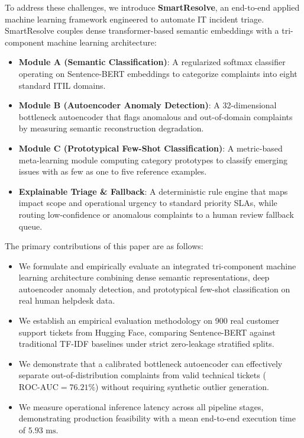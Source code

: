 \documentclass[conference]{IEEEtran}
\begin{document}
To address these challenges, we introduce \textbf{SmartResolve}, an end-to-end applied machine learning framework engineered to automate IT incident triage. SmartResolve couples dense transformer-based semantic embeddings with a tri-component machine learning architecture:
\begin{itemize}
    \item \textbf{Module A (Semantic Classification)}: A regularized softmax classifier operating on Sentence-BERT embeddings to categorize complaints into eight standard ITIL domains.
    \item \textbf{Module B (Autoencoder Anomaly Detection)}: A 32-dimensional bottleneck autoencoder that flags anomalous and out-of-domain complaints by measuring semantic reconstruction degradation.
    \item \textbf{Module C (Prototypical Few-Shot Classification)}: A metric-based meta-learning module computing category prototypes to classify emerging issues with as few as one to five reference examples.
    \item \textbf{Explainable Triage \& Fallback}: A deterministic rule engine that maps impact scope and operational urgency to standard priority SLAs, while routing low-confidence or anomalous complaints to a human review fallback queue.
\end{itemize}

The primary contributions of this paper are as follows:
\begin{itemize}
    \item We formulate and empirically evaluate an integrated tri-component machine learning architecture combining dense semantic representations, deep autoencoder anomaly detection, and prototypical few-shot classification on real human helpdesk data.
    \item We establish an empirical evaluation methodology on 900 real customer support tickets from Hugging Face, comparing Sentence-BERT against traditional TF-IDF baselines under strict zero-leakage stratified splits.
    \item We demonstrate that a calibrated bottleneck autoencoder can effectively separate out-of-distribution complaints from valid technical tickets ($\text{ROC-AUC} = 76.21\%$) without requiring synthetic outlier generation.
    \item We measure operational inference latency across all pipeline stages, demonstrating production feasibility with a mean end-to-end execution time of $5.93\text{ ms}$.
\end{itemize}
\end{document}
